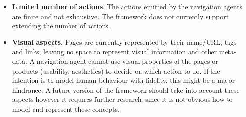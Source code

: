 \begin{itemize}
    \item \textbf{Limited number of actions}. The actions emitted by the 
    navigation agents are finite and not exhaustive. The framework does not 
    currently support extending the number of actions. %
    
    \item \textbf{Visual aspects}. Pages are currently represented by their 
    name/URL, tags and links, leaving no space to represent visual information 
    and other meta-data. A navigation agent cannot use visual properties of the 
    pages or products (usability, aesthetics) to decide on which action to do. 
    If the intention is to model human behaviour with fidelity, this might be a 
    major hindrance. A future version of the framework should take into account 
    these aspects however it requires further research, since it is not obvious 
    how to model and represent these concepts.
    
\end{itemize}
